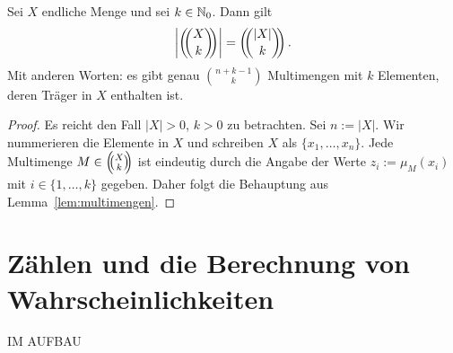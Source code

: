 \begin{thm}
	Sei $X$ endliche Menge und sei $k \in \mathbb{N}_0$. Dann gilt 
	\[
			\left| \mbinom{X}{k} \right| = \mbinom{|X|}{k}. 
	\]
	Mit anderen Worten: es gibt genau $\binom{n+k-1}{k}$ Multimengen mit $k$ Elementen, deren Träger in $X$ enthalten ist. 
\end{thm}
\begin{proof}
	Es reicht den Fall $|X| >0$, $k>0$ zu betrachten. Sei $n:= |X|$. Wir nummerieren die Elemente in $X$ und schreiben $X$ als $\{x_1,\ldots,x_n\}$. Jede Multimenge $M \in \left(\!\!\binom{X}{k}\!\!\right)$ ist eindeutig durch die Angabe der Werte $z_i := \mu_M(x_i)$ mit $i \in \{1,\ldots,k\}$ gegeben. Daher folgt die Behauptung aus Lemma~\ref{lem:multimengen}. 
\end{proof} 

\section{Zählen und die Berechnung von Wahrscheinlichkeiten} 

IM AUFBAU 
